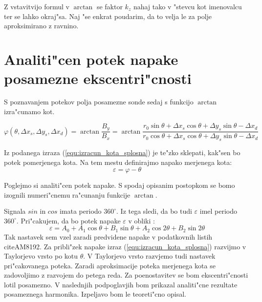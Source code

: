 Z vstavitvijo formul v $\arctan$ se faktor $k_z$ nahaj tako v "stevcu kot imenovalcu ter se lahko okraj"sa. Naj "se  enkrat poudarim, da to velja le za polje aproksimirano z ravnino.






\section{Analiti"cen potek napake posamezne ekscentri"cnosti}

S poznavanjem potekov polja posamezne sonde sedaj s funkcijo $\arctan$ izra"cunamo kot.

\begin{equation}
\label{equ:izracun_kota_splosna}
\varphi(\theta,\Delta x_s, \Delta y_s, \Delta x_d)=\arctan\frac{B_y}{B_x}=\arctan\frac{r_0 \sin\theta +\Delta x_s \cos\theta +\Delta y_s \sin\theta-\Delta x_d}{r_0 \cos\theta +\Delta x_s \cos\theta +\Delta y_s \sin\theta -\Delta x_d}
\end{equation}




Iz podanega izraza (\ref{equ:izracun_kota_splosna}) je te"zko sklepati, kak"sen bo potek pomerjenega kota.
Na tem mestu definirajmo napako merjenega kota:
\begin{equation}
\varepsilon=\varphi-\theta
\end{equation}

Poglejmo si analiti"cen potek napake.  S spodaj opisanim postopkom se bomo izognili numeri"cnemu ra"cunanju funkcije $\arctan$.

Signala $sin$ in $cos$ imata periodo $360^\circ$. Iz tega sledi, da bo tudi $\varepsilon$ imel periodo $360^\circ $. Pri"cakujem, da bo potek napake $\varepsilon$ v obliki :
\begin{equation}
\label{equ:nastavek}
\varepsilon=A_0+A_1 \cos \theta +B_1 \sin \theta+A_2 \cos 2\theta +B_2 \sin 2\theta
\end{equation}
Tak nastavek sem vzel zaradi predvidene napake v podatkovnih listih citeAM8192.
Za pribli"zek napake izraz  (\ref{equ:izracun_kota_splosna}) razvijmo v Taylorjevo vrsto po kotu $\theta$. V Taylorjevo vrsto razvjemo tudi nastavek pri"cakovanega poteka. Zaradi aproksimacije poteka merjenega kota se zadovoljimo z razvojem do petega reda. Za poenostavitev se bom ekscentri"cnosti lotil posamezno. V naslednjih podpoglavjih bom prikazal analiti"cne rezultate posameznega harmonika. Izpeljavo bom le teoreti"cno opisal.

